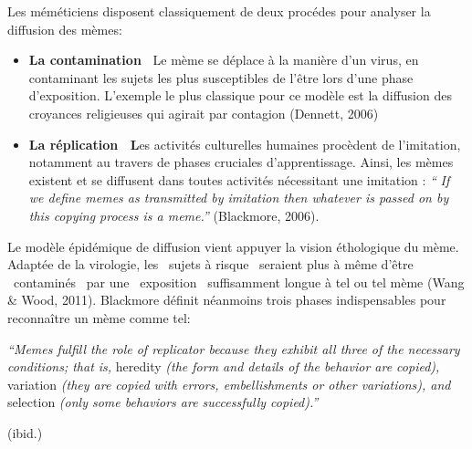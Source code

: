 Les m\'em\'eticiens disposent classiquement de deux proc\'edes pour
analyser la diffusion des m\`emes: 

\begin{itemize}
\item
{\color[rgb]{0.12156863,0.28627452,0.49019608}
\textbf{La contamination~\newline
}Le m\`eme se d\'eplace \`a la mani\`ere d{\textquoteright}un virus, en
contaminant les sujets les plus susceptibles de
l{\textquoteright}\^etre lors d{\textquoteright}une phase
d{\textquoteright}exposition. L{\textquoteright}exemple le plus
classique pour ce mod\`ele est la diffusion des croyances religieuses
qui agirait par contagion (Dennett, 2006)}
\item
{\color[rgb]{0.12156863,0.28627452,0.49019608}
\textbf{La r\'eplication~\newline
L}es activit\'es culturelles humaines proc\`edent de
l{\textquoteright}imitation, notamment au travers de phases cruciales
d{\textquoteright}apprentissage. Ainsi, les m\`emes existent et se
diffusent dans toutes activit\'es n\'ecessitant une imitation :
\textit{{\textquotedblleft}} \textit{If we define memes as transmitted
by imitation then whatever is passed on by this copying process is a
meme.{\textquotedblright} }(Blackmore, 2006). }
\end{itemize}

Le mod\`ele \'epid\'emique de diffusion vient appuyer la vision
\'ethologique du m\`eme. Adapt\'ee de la virologie, les
{\guillemotleft}~sujets \`a risque~{\guillemotright} seraient plus \`a
m\^eme d{\textquoteright}\^etre
{\guillemotleft}~contamin\'es~{\guillemotright} par une
{\guillemotleft}~exposition~{\guillemotright} suffisamment longue \`a
tel ou tel m\`eme (Wang \& Wood, 2011). Blackmore d\'efinit n\'eanmoins
trois phases indispensables pour reconna\^itre un m\`eme comme tel: 

\textit{{\textquotedblleft}Memes fulfill the role of replicator because
they exhibit all three of the necessary conditions; that is,
}heredity\textit{ (the form and details of the behavior are copied),
}variation\textit{ (they are copied with errors, embellishments or
other variations), and }selection\textit{ (only some behaviors are
successfully copied).{\textquotedblright}} 

(ibid.)

